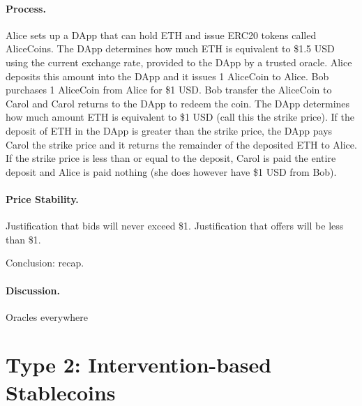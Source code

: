 \paragraph{Process.} Alice sets up a DApp that can hold ETH and issue ERC20 tokens called AliceCoins. The DApp determines how much ETH is equivalent to \$1.5 USD using the current exchange rate, provided to the DApp by a trusted oracle. Alice deposits this amount into the DApp and it issues 1 AliceCoin to Alice. Bob purchases 1 AliceCoin from Alice for \$1 USD. Bob transfer the AliceCoin to Carol and Carol returns to the DApp to redeem the coin. The DApp determines how much amount ETH is equivalent to \$1 USD (call this the strike price). If the deposit of ETH in the DApp is greater than the strike price, the DApp pays Carol the strike price and it returns the remainder of the deposited ETH to Alice. If the strike price is less than or equal to the deposit, Carol is paid the entire deposit and Alice is paid nothing (she does however have \$1 USD from Bob).

\paragraph{Price Stability.} Justification that bids will never exceed \$1. Justification that offers will be less than \$1.

Conclusion: recap.

\paragraph{Discussion.} Oracles everywhere



\section{Type 2: Intervention-based Stablecoins}
\label{sec:t2}



